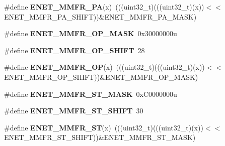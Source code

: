 \begin{DoxyCompactItemize}
\item 
\#define {\bfseries E\+N\+E\+T\+\_\+\+M\+M\+F\+R\+\_\+\+PA}(x)~(((uint32\+\_\+t)(((uint32\+\_\+t)(x))$<$$<$E\+N\+E\+T\+\_\+\+M\+M\+F\+R\+\_\+\+P\+A\+\_\+\+S\+H\+I\+FT))\&E\+N\+E\+T\+\_\+\+M\+M\+F\+R\+\_\+\+P\+A\+\_\+\+M\+A\+SK)\hypertarget{group__ENET__Register__Masks_gabc1d7007e1d9cee9e24f31a8c289f375}{}\label{group__ENET__Register__Masks_gabc1d7007e1d9cee9e24f31a8c289f375}

\item 
\#define {\bfseries E\+N\+E\+T\+\_\+\+M\+M\+F\+R\+\_\+\+O\+P\+\_\+\+M\+A\+SK}~0x30000000u\hypertarget{group__ENET__Register__Masks_ga90049372c88bf3a759aecb3b9ab7208d}{}\label{group__ENET__Register__Masks_ga90049372c88bf3a759aecb3b9ab7208d}

\item 
\#define {\bfseries E\+N\+E\+T\+\_\+\+M\+M\+F\+R\+\_\+\+O\+P\+\_\+\+S\+H\+I\+FT}~28\hypertarget{group__ENET__Register__Masks_ga6c7887926bc9935d7fd783894fb4a34c}{}\label{group__ENET__Register__Masks_ga6c7887926bc9935d7fd783894fb4a34c}

\item 
\#define {\bfseries E\+N\+E\+T\+\_\+\+M\+M\+F\+R\+\_\+\+OP}(x)~(((uint32\+\_\+t)(((uint32\+\_\+t)(x))$<$$<$E\+N\+E\+T\+\_\+\+M\+M\+F\+R\+\_\+\+O\+P\+\_\+\+S\+H\+I\+FT))\&E\+N\+E\+T\+\_\+\+M\+M\+F\+R\+\_\+\+O\+P\+\_\+\+M\+A\+SK)\hypertarget{group__ENET__Register__Masks_gac00d5a828e48d9012aacde18087a622c}{}\label{group__ENET__Register__Masks_gac00d5a828e48d9012aacde18087a622c}

\item 
\#define {\bfseries E\+N\+E\+T\+\_\+\+M\+M\+F\+R\+\_\+\+S\+T\+\_\+\+M\+A\+SK}~0x\+C0000000u\hypertarget{group__ENET__Register__Masks_ga98ea3eee6cc1ad4be4cd471b4adfd876}{}\label{group__ENET__Register__Masks_ga98ea3eee6cc1ad4be4cd471b4adfd876}

\item 
\#define {\bfseries E\+N\+E\+T\+\_\+\+M\+M\+F\+R\+\_\+\+S\+T\+\_\+\+S\+H\+I\+FT}~30\hypertarget{group__ENET__Register__Masks_gabff166a3d09c782f336fac767d5ab5ab}{}\label{group__ENET__Register__Masks_gabff166a3d09c782f336fac767d5ab5ab}

\item 
\#define {\bfseries E\+N\+E\+T\+\_\+\+M\+M\+F\+R\+\_\+\+ST}(x)~(((uint32\+\_\+t)(((uint32\+\_\+t)(x))$<$$<$E\+N\+E\+T\+\_\+\+M\+M\+F\+R\+\_\+\+S\+T\+\_\+\+S\+H\+I\+FT))\&E\+N\+E\+T\+\_\+\+M\+M\+F\+R\+\_\+\+S\+T\+\_\+\+M\+A\+SK)\hypertarget{group__ENET__Register__Masks_ga674fe7443651f825f3b58144847a7f91}{}\label{group__ENET__Register__Masks_ga674fe7443651f825f3b58144847a7f91}


\end{DoxyCompactItemize}
